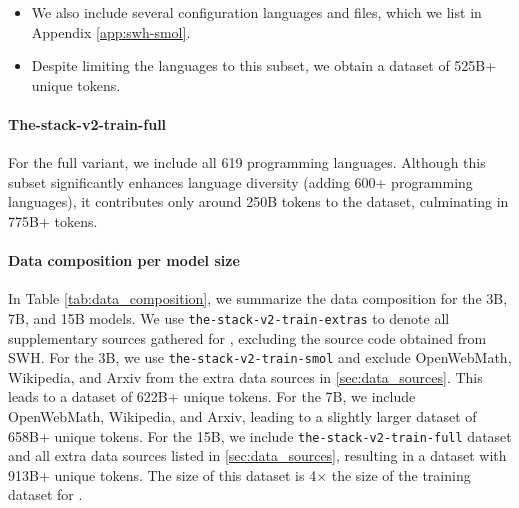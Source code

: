 \documentclass[10pt]{article} %
\begin{document}
\begin{itemize}
    \item We also include several configuration languages and files, which we list in Appendix \ref{app:swh-smol}. 
    \item Despite limiting the languages to this subset, we obtain a dataset of 525B+ unique tokens. 
\end{itemize}

\paragraph{The-stack-v2-train-full} For the full variant, we include all 619 programming languages. Although this subset significantly enhances language diversity (adding 600+ programming languages), it contributes only around 250B tokens to the dataset, culminating in 775B+ tokens. 

\paragraph{Data composition per model size} In Table \ref{tab:data_composition}, we summarize the data composition for the 3B, 7B, and 15B models. We use \texttt{the-stack-v2-train-extras} to denote all supplementary sources gathered for \starcodertwo{}, excluding the source code obtained from SWH. For the 3B, we use \verb|the-stack-v2-train-smol| and exclude OpenWebMath, Wikipedia, and Arxiv from the extra data sources in \cref{sec:data_sources}. This leads to a dataset of 622B+ unique tokens.  For the 7B, we include OpenWebMath, Wikipedia, and Arxiv, leading to a slightly larger dataset of 658B+ unique tokens. For the 15B, we include \verb|the-stack-v2-train-full| dataset and all extra data sources listed in \cref{sec:data_sources}, resulting in a dataset with 913B+ unique tokens. The size of this dataset is 4$\times$ the size of the training dataset for \starcoderbase{}.
\end{document}
